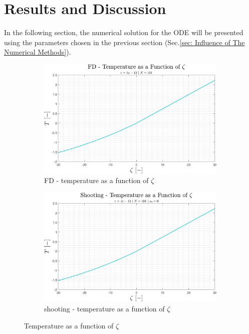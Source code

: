 \documentclass[11pt, a4paper]{article}
\begin{document}
\newpage
\section{Results and Discussion}
\label{sec: results}
In the following section, the numerical solution for the ODE will be presented using the parameters chosen in the previous section (Sec.\ref{sec: Influence of The Numerical Methods}).
\begin{figure}[H]
    \centering
    \begin{subfigure}[c]{0.49\textwidth}
        \centering
        \includegraphics[width=\textwidth]{images/FD - T vs zeta.png}
        \caption{FD - temperature as a function of $\zeta$}
        \label{fig: FD - T vs zeta}
    \end{subfigure}
    \hfill
    \begin{subfigure}[c]{0.49\textwidth}
        \centering
        \includegraphics[width=\textwidth]{images/shooting - T vs zeta.png}
        \caption{shooting - temperature as a function of $\zeta$}
        \label{fig: shooting - T vs zeta}
    \end{subfigure}
    \caption{Temperature as a function of $\zeta$}
    \label{fig: T vs zeta}
\end{figure}
\end{document}
